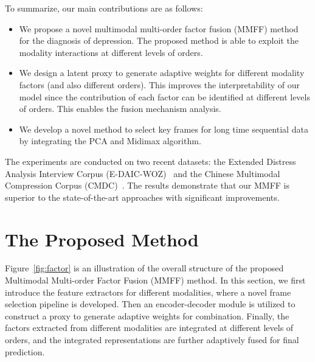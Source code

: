 \documentclass{article}
\begin{document}
To summarize, our main contributions are as follows:
\begin{itemize}
\item We propose a novel multimodal multi-order factor fusion (MMFF) method for the diagnosis of depression. The proposed method is able to exploit the modality interactions at different levels of orders.
\item We design a latent proxy to generate adaptive weights for different modality factors (and also different orders). This improves the interpretability of our model since the contribution of each factor can be identified at different levels of orders.
This enables the fusion mechanism analysis.
\item We develop a novel method to select key frames for long time sequential data by integrating the PCA and Midimax algorithm.
\end{itemize}
The experiments are conducted on two recent datasets: the Extended Distress Analysis Interview Corpus (E-DAIC-WOZ)~\cite{AVEC2019,DAIC} and the Chinese Multimodal Compression Corpus (CMDC)~\cite{CMDC}.
The results demonstrate that our MMFF is superior to the state-of-the-art approaches with significant improvements.


\section{The Proposed Method}
Figure~\ref{fig:factor} is an illustration of the overall structure of the proposed Multimodal Multi-order Factor Fusion (MMFF) method. In this section, we first introduce the feature extractors for different modalities, where a novel frame selection pipeline is developed.
Then an encoder-decoder module is utilized to construct a proxy to generate adaptive weights for combination.
Finally, the factors extracted from different modalities are integrated at different levels of orders, and the integrated representations are further adaptively fused for final prediction.
\end{document}
